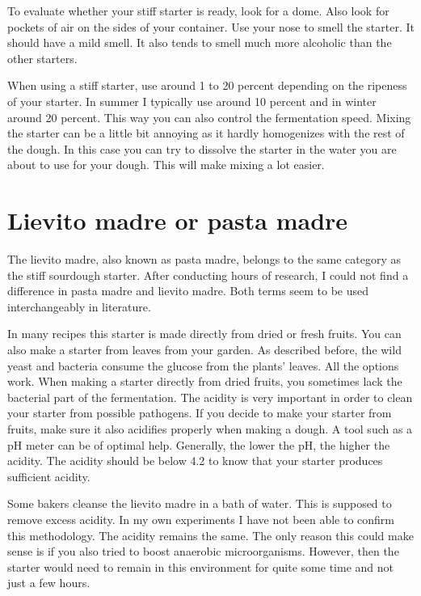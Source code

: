 To evaluate whether your stiff starter is ready, look for a dome. Also look for
pockets of air on the sides of your container. Use your nose to smell the
starter. It should have a mild smell. It also tends to smell much more
alcoholic than the other starters.

When using a stiff starter, use around 1 to 20 percent depending on the ripeness of
your starter. In summer I typically use around 10 percent and in winter
around 20 percent. This way you can also control the fermentation speed.
Mixing the starter can be a little bit annoying as it hardly homogenizes with
the rest of the dough. In this case you can try to dissolve the starter in the
water you are about to use for your dough. This will make mixing a lot easier.


\section{Lievito madre or pasta madre}

The lievito madre, also known as pasta madre, belongs to the same category as
the stiff sourdough starter. After conducting hours of research, I could not
find a difference in pasta madre and lievito madre. Both terms seem to be
used interchangeably in literature.

In many recipes this starter is made directly
from dried or fresh fruits. You can also make a starter from leaves from your
garden. As described before, the wild yeast and bacteria consume the glucose
from the plants' leaves. All the options work. When making a starter directly
from dried fruits, you sometimes lack the bacterial part of the fermentation.
The acidity is very important in order to clean your starter from possible
pathogens. If you decide to make your starter from fruits, make sure it also
acidifies properly when making a dough. A tool such as a pH meter can be of
optimal help. Generally, the lower the pH, the higher the acidity. The acidity
should be below 4.2 to know that your starter produces sufficient acidity.

Some bakers cleanse the lievito madre in a bath of water. This is supposed to
remove excess acidity. In my own experiments I have not been able to confirm
this methodology. The acidity remains the same. The only reason this could
make sense is if you also tried to boost anaerobic microorganisms. However, then the
starter would need to remain in this environment for quite some time and not just
a few hours.

